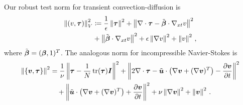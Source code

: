 \documentclass{article}
\begin{document}
Our robust test norm for transient convection-diffusion is 
\begin{align}
\left\| \left( v,\boldsymbol\tau \right) \right\|_{V}^2 &\coloneqq
\frac{1}{\epsilon}\left\| \boldsymbol\tau \right\|^2
+ \left\| \nabla\cdot \boldsymbol\tau - \tilde{\boldsymbol\beta}\cdot\nabla_{xt} v \right\|^2 \nonumber\\
&+\left\| \tilde{\boldsymbol\beta}\cdot \nabla_{xt} v \right\|^2
+ \epsilon\left\| \nabla v \right\|^2
+ \left\| v \right\|^2\,,
\label{eq:robustConfusion}
\end{align}
where $\tilde{\boldsymbol\beta}=(\boldsymbol\beta,1)^T$.
The analogous norm for incompressible Navier-Stokes is
\begin{align*}
\left\| \left\{ \boldsymbol v,\boldsymbol\tau \right\} \right\|^2&=\frac{1}{\nu}\left\| \boldsymbol\tau-\frac{1}{N}\operatorname*{tr}(\boldsymbol\tau)\boldsymbol I \right\|^2
+\left\| 2\nabla\cdot\boldsymbol\tau-\tilde{\boldsymbol u}\cdot\left( \nabla\boldsymbol v+(\nabla\boldsymbol v)^T \right)-\frac{\partial\boldsymbol v}{\partial t} \right\|^2\\
&\quad+\left\| \tilde{\boldsymbol u}\cdot\left( \nabla\boldsymbol v+(\nabla\boldsymbol v)^T \right)+\frac{\partial\boldsymbol v}{\partial t} \right\|^2
+\nu\left\| \nabla\boldsymbol v \right\|^2
+\left\| \boldsymbol v \right\|^2\,.
\end{align*}
\end{document}

